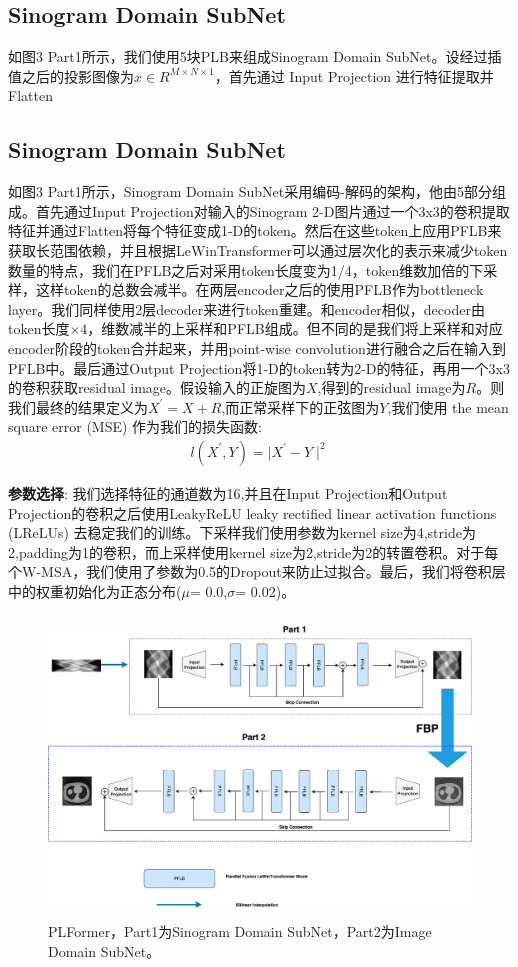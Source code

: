 \subsection{Sinogram Domain SubNet}
如图3 Part1所示，我们使用5块PLB来组成Sinogram Domain SubNet。设经过插值之后的投影图像为$x\in R^{M\times{N}\times{1}}$，首先通过 Input Projection 进行特征提取并Flatten

\subsection{Sinogram Domain SubNet}
如图3 Part1所示，Sinogram Domain SubNet采用编码-解码的架构，他由5部分组成。首先通过Input Projection对输入的Sinogram 2-D图片通过一个3x3的卷积提取特征并通过Flatten将每个特征变成1-D的token。然后在这些token上应用PFLB来获取长范围依赖，并且根据LeWinTransformer可以通过层次化的表示来减少token数量的特点，我们在PFLB之后对采用token长度变为1/4，token维数加倍的下采样，这样token的总数会减半。在两层encoder之后的使用PFLB作为bottleneck layer。我们同样使用2层decoder来进行token重建。和encoder相似，decoder由token长度$\times4$，维数减半的上采样和PFLB组成。但不同的是我们将上采样和对应encoder阶段的token合并起来，并用point-wise convolution进行融合之后在输入到PFLB中。最后通过Output Projection将1-D的token转为2-D的特征，再用一个3x3的卷积获取residual image。假设输入的正旋图为$X$,得到的residual image为$R$。则我们最终的结果定义为$X^{'}=X+R$,而正常采样下的正弦图为$Y$,我们使用 the mean square error (MSE) 作为我们的损失函数:\begin{equation}\begin{aligned}
l(X^{'},Y) = \mid X^{'}-Y\mid^{2}\end{aligned}
\end{equation}\par
\textbf{参数选择}: 我们选择特征的通道数为16,并且在Input Projection和Output Projection的卷积之后使用LeakyReLU leaky rectified linear activation functions (LReLUs)\cite{2013Rectifier} 去稳定我们的训练。下采样我们使用参数为kernel size为4,stride为2,padding为1的卷积，而上采样使用kernel size为2,stride为2的转置卷积。对于每个W-MSA，我们使用了参数为0.5的Dropout\cite{2014Dropout}来防止过拟合。最后，我们将卷积层中的权重初始化为正态分布($\mu$= 0.0,$\sigma$= 0.02)。
\begin{figure}
	\centering
	\includegraphics[height=8cm,width=12cm]{6.eps}
	\caption{PLFormer，Part1为Sinogram Domain SubNet，Part2为Image Domain SubNet。}
	\label{fig3}
\end{figure}
